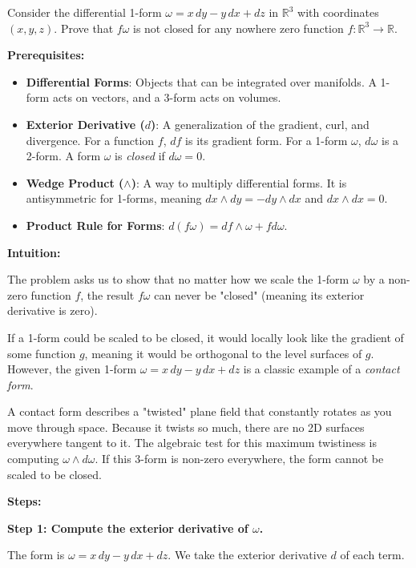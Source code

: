 \begin{exercise}
\label{geometry:2018:9}
Consider the differential 1-form $\omega = x\, dy - y\, dx + dz$ in $\mathbb{R}^{3}$ with coordinates $(x, y, z)$. Prove that $f\omega$ is not closed for any nowhere zero function $f : \mathbb{R}^{3} \to \mathbb{R}$.
\end{exercise}

\begin{solution}
\textbf{Prerequisites:}
\begin{itemize}
    \item \textbf{Differential Forms}: Objects that can be integrated over manifolds. A 1-form acts on vectors, and a 3-form acts on volumes.
    \item \textbf{Exterior Derivative ($d$)}: A generalization of the gradient, curl, and divergence. For a function $f$, $df$ is its gradient form. For a 1-form $\omega$, $d\omega$ is a 2-form. A form $\omega$ is \textit{closed} if $d\omega = 0$.
    \item \textbf{Wedge Product ($\wedge$)}: A way to multiply differential forms. It is antisymmetric for 1-forms, meaning $dx \wedge dy = -dy \wedge dx$ and $dx \wedge dx = 0$.
    \item \textbf{Product Rule for Forms}: $d(f\omega) = df \wedge \omega + f d\omega$.
\end{itemize}

\textbf{Intuition:}

The problem asks us to show that no matter how we scale the 1-form $\omega$ by a non-zero function $f$, the result $f\omega$ can never be "closed" (meaning its exterior derivative is zero).

If a 1-form could be scaled to be closed, it would locally look like the gradient of some function $g$, meaning it would be orthogonal to the level surfaces of $g$. However, the given 1-form $\omega = x\, dy - y\, dx + dz$ is a classic example of a \textit{contact form}. 

A contact form describes a "twisted" plane field that constantly rotates as you move through space. Because it twists so much, there are no 2D surfaces everywhere tangent to it. The algebraic test for this maximum twistiness is computing $\omega \wedge d\omega$. If this 3-form is non-zero everywhere, the form cannot be scaled to be closed.

\textbf{Steps:}

\textbf{Step 1: Compute the exterior derivative of $\omega$.}

The form is $\omega = x\, dy - y\, dx + dz$. We take the exterior derivative $d$ of each term.


\end{solution}
